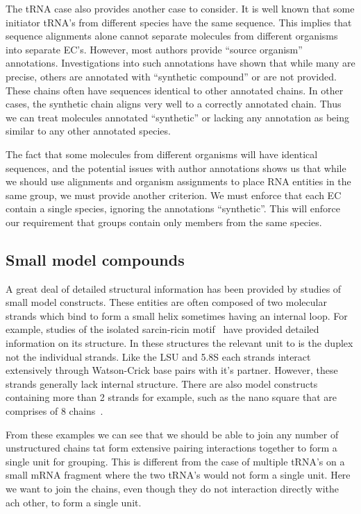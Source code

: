 The tRNA case also provides another case to consider. It is well known that some
initiator tRNA's from different species have the same sequence. This implies
that sequence alignments alone cannot separate molecules from different
organisms into separate EC's. However, most authors provide ``source organism''
annotations. Investigations into such annotations have shown that while many are
precise, others are annotated with ``synthetic compound'' or are not provided.
These chains often have sequences identical to other annotated chains. In other
cases, the synthetic chain aligns very well to a correctly annotated chain. Thus
we can treat molecules annotated ``synthetic'' or lacking any annotation as
being similar to any other annotated species.

The fact that some molecules from different organisms will have identical
sequences, and the potential issues with author annotations shows us that while
we should use alignments and organism assignments to place RNA entities in the
same group, we must provide another criterion. We must enforce that each EC
contain a single species, ignoring the annotations ``synthetic''. This will
enforce our requirement that groups contain only members from the same species.

\subsection{Small model compounds}

A great deal of detailed structural information has been provided by studies of
small model constructs. These entities are often composed of two molecular
strands which bind to form a small helix sometimes having an internal loop. For
example, studies of the isolated sarcin-ricin motif~\cite{Olieric2009} have
provided detailed information on its structure. In these structures the relevant
unit to is the duplex not the individual strands. Like the LSU and 5.8S each
strands interact extensively through Watson-Crick base pairs with it's partner.
However, these strands generally lack internal structure. There are also model
constructs containing more than 2 strands for example, such as the nano square
that are comprises of 8 chains~\cite{Dibrov2011a}.

From these examples we can see that we should be able to join any number of
unstructured chains tat form extensive pairing interactions together to form a
single unit for grouping. This is different from the case of multiple tRNA's on
a small mRNA fragment where the two tRNA's would not form a single unit. Here we
want to join the chains, even though they do not interaction directly withe ach
other, to form a single unit.

